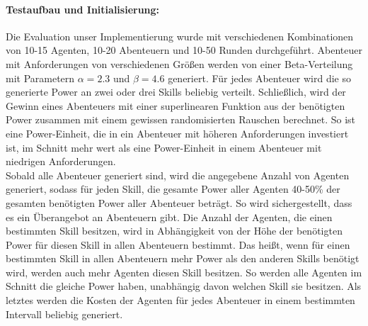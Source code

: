 \documentclass[fleqn,10pt]{SelfArx} %
\begin{document}
\paragraph{Testaufbau und Initialisierung:}
Die Evaluation unser Implementierung wurde mit verschiedenen Kombinationen von 10-15 Agenten, 10-20 Abenteuern und 10-50 Runden durchgeführt. Abenteuer mit Anforderungen von verschiedenen Größen werden von einer Beta-Verteilung mit Parametern $\alpha=2.3$ und $\beta=4.6$ generiert. Für jedes Abenteuer wird die so generierte Power an zwei oder drei Skills beliebig verteilt. Schließlich, wird der Gewinn eines Abenteuers mit einer superlinearen Funktion aus der benötigten Power zusammen mit einem gewissen randomisierten Rauschen berechnet. So ist eine Power-Einheit, die in ein Abenteuer mit höheren Anforderungen investiert ist, im Schnitt mehr wert als eine Power-Einheit in einem Abenteuer mit niedrigen Anforderungen.\\
Sobald alle Abenteuer generiert sind, wird die angegebene Anzahl von Agenten generiert, sodass für jeden Skill, die gesamte Power aller Agenten 40-50\% der gesamten benötigten Power aller Abenteuer beträgt. So wird sichergestellt, dass es ein Überangebot an Abenteuern gibt. Die Anzahl der Agenten, die einen bestimmten Skill besitzen, wird in Abhängigkeit von der Höhe der benötigten Power für diesen Skill in allen Abenteuern bestimmt. Das heißt, wenn für einen bestimmten Skill in allen Abenteuern mehr Power als den anderen Skills benötigt wird, werden auch mehr Agenten diesen Skill besitzen. So werden alle Agenten im Schnitt die gleiche Power haben, unabhängig davon welchen Skill sie besitzen. Als letztes werden die Kosten der Agenten für jedes Abenteuer in einem bestimmten Intervall beliebig generiert.
\end{document}
